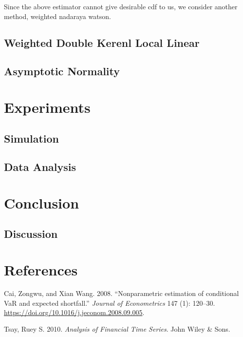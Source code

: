 \documentclass[
]{article}
\newlength{\cslhangindent}
\newenvironment{cslreferences}%
  {\setlength{\parindent}{0pt}%
  \everypar{\setlength{\hangindent}{\cslhangindent}}\ignorespaces}%
  {\par}
\theoremstyle{definition}
\theoremstyle{definition}
\theoremstyle{definition}
\theoremstyle{remark}
\begin{document}
Since the above estimator cannot give desirable cdf to us, we consider another method, weighted nadaraya watson.

\hypertarget{weighted-double-kerenl-local-linear}{%
\subsection{Weighted Double Kerenl Local Linear}\label{weighted-double-kerenl-local-linear}}

\hypertarget{asymptotic-normality}{%
\subsection{Asymptotic Normality}\label{asymptotic-normality}}

\hypertarget{experiment}{%
\section{Experiments}\label{experiment}}

\hypertarget{simulation}{%
\subsection{Simulation}\label{simulation}}

\hypertarget{data-analysis}{%
\subsection{Data Analysis}\label{data-analysis}}

\hypertarget{conclusion}{%
\section{Conclusion}\label{conclusion}}

\hypertarget{discussion}{%
\subsection{Discussion}\label{discussion}}

\newpage

\hypertarget{references}{%
\section*{References}\label{references}}

\hypertarget{refs}{}
\begin{cslreferences}
\leavevmode\hypertarget{ref-cai:2008aa}{}%
Cai, Zongwu, and Xian Wang. 2008. ``Nonparametric estimation of conditional VaR and expected shortfall.'' \emph{Journal of Econometrics} 147 (1): 120--30. \url{https://doi.org/10.1016/j.jeconom.2008.09.005}.

\leavevmode\hypertarget{ref-Tsay:2010aa}{}%
Tsay, Ruey S. 2010. \emph{Analysis of Financial Time Series}. John Wiley \& Sons.
\end{cslreferences}
\end{document}
